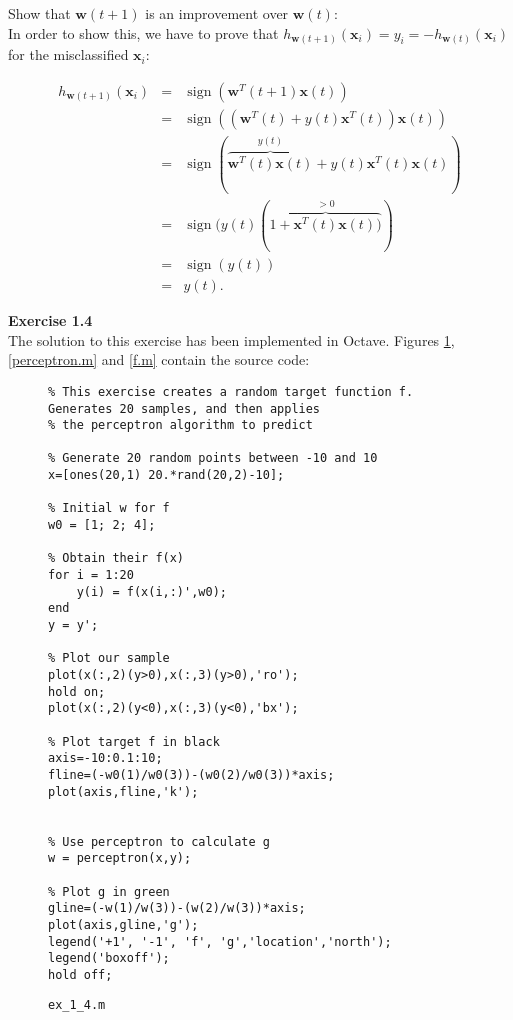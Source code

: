 \documentclass[11pt]{article}
\begin{document}
Show that $\mathbf{w}(t+1)$ is an improvement over $\mathbf{w}(t)$:\\

In order to show this, we have to prove that $h_{\mathbf{w}(t+1)}(\mathbf{x}_i)=y_i=-h_{\mathbf{w}(t)}(\mathbf{x}_i)$ for the misclassified $\mathbf{x}_i$:

\begin{eqnarray*}
h_{\mathbf{w}(t+1)}(\mathbf{x}_i)&=&\operatorname{sign}(\mathbf{w}^T(t+1)\mathbf{x}(t))\\
&=&\operatorname{sign}((\mathbf{w}^T(t)+y(t)\mathbf{x}^T(t))\mathbf{x}(t))\\
&=&\operatorname{sign}(\overbrace{\mathbf{w}^T(t)\mathbf{x}(t)}^{y(t)}+y(t)\mathbf{x}^T(t)\mathbf{x}(t))\\
&=&\operatorname{sign}(y(t)(\overbrace{1+\mathbf{x}^T(t)\mathbf{x}(t))}^{>0})\\
&=&\operatorname{sign}(y(t))\\
&=&y(t).
\end{eqnarray*}

\textbf{Exercise 1.4}\\

The solution to this exercise has been implemented in Octave. Figures \ref{ex_1_4.m}, \ref{perceptron.m} and \ref{f.m} contain the source code:

\begin{figure}[H]
\captionsetup{justification=raggedright,
singlelinecheck=false
}
\caption{\texttt{ex\_1\_4.m}}
\begin{lstlisting}
% This exercise creates a random target function f. Generates 20 samples, and then applies
% the perceptron algorithm to predict

% Generate 20 random points between -10 and 10
x=[ones(20,1) 20.*rand(20,2)-10];

% Initial w for f
w0 = [1; 2; 4];

% Obtain their f(x)
for i = 1:20
    y(i) = f(x(i,:)',w0);
end
y = y';

% Plot our sample
plot(x(:,2)(y>0),x(:,3)(y>0),'ro');
hold on;
plot(x(:,2)(y<0),x(:,3)(y<0),'bx');

% Plot target f in black
axis=-10:0.1:10;
fline=(-w0(1)/w0(3))-(w0(2)/w0(3))*axis;
plot(axis,fline,'k');


% Use perceptron to calculate g
w = perceptron(x,y);

% Plot g in green
gline=(-w(1)/w(3))-(w(2)/w(3))*axis;
plot(axis,gline,'g');
legend('+1', '-1', 'f', 'g','location','north');
legend('boxoff');
hold off;
\end{lstlisting}
\label{ex_1_4.m}
\end{figure}
\end{document}
